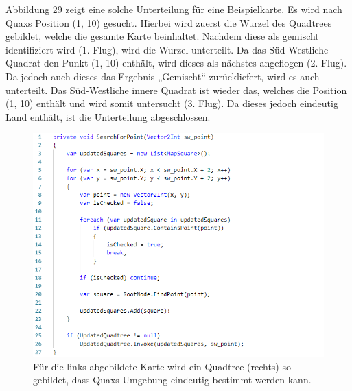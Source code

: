 \documentclass[a4paper,12pt]{article}
\begin{document}
Abbildung 29 zeigt eine solche Unterteilung für eine Beispielkarte. Es wird nach Quaxs Position (1, 10) gesucht. Hierbei wird zuerst die Wurzel des Quadtrees gebildet, welche die gesamte Karte beinhaltet. Nachdem diese als gemischt identifiziert wird (1. Flug), wird die Wurzel unterteilt. Da das Süd-Westliche Quadrat den Punkt (1, 10) enthält, wird dieses als nächstes angeflogen (2. Flug). Da jedoch auch dieses das Ergebnis „Gemischt“ zurückliefert, wird es auch unterteilt. Das Süd-Westliche innere Quadrat ist wieder das, welches die Position (1, 10) enthält und wird somit untersucht (3. Flug). Da dieses jedoch eindeutig Land enthält, ist die Unterteilung abgeschlossen.
\begin{figure}[H]
\centering
    \includegraphics[width=1\linewidth]{Bilder/Aufgabe3/Quadtree_01.png}
    \caption{Für die links abgebildete Karte wird ein Quadtree (rechts) so gebildet, dass Quaxs Umgebung eindeutig bestimmt werden kann.}
\end{figure}
\end{document}
